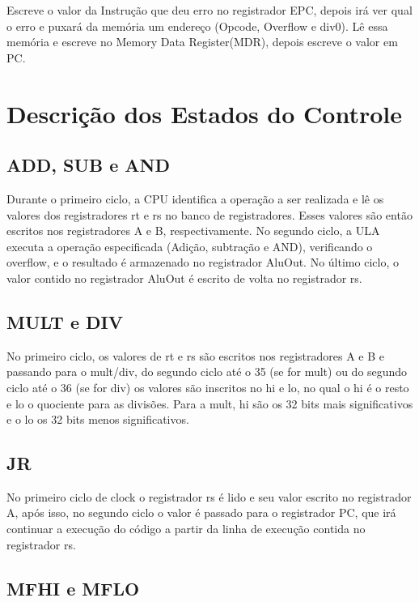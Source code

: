 Escreve o valor da Instrução que deu erro no registrador EPC, depois irá ver qual o erro e puxará da memória um endereço (Opcode, Overflow e div0). Lê essa memória e escreve no Memory Data Register(MDR), depois escreve o valor em PC.
 
\newpage

\section{Descrição dos Estados do Controle}

\subsection{ADD, SUB e AND}
Durante o primeiro ciclo, a CPU identifica a operação a ser realizada e lê os valores dos registradores rt e rs no banco de registradores. Esses valores são então escritos nos registradores A e B, respectivamente. No segundo ciclo, a ULA executa a operação especificada (Adição, subtração e AND), verificando o overflow, e o resultado é armazenado no registrador AluOut. No último ciclo, o valor contido no registrador AluOut é escrito de volta no registrador rs.

\subsection{MULT e DIV}

No primeiro ciclo, os valores de rt e rs são escritos nos registradores A e B e passando para o mult/div, do segundo ciclo até o 35 (se for mult) ou do segundo ciclo até o 36 (se for div) os valores são inscritos no hi e lo, no qual o hi é o resto e lo o quociente para as divisões. Para a mult, hi são os 32 bits mais significativos e o lo os 32 bits menos significativos.

\subsection{JR}

No primeiro ciclo de clock o registrador rs é lido e seu valor escrito no registrador A, após isso, no segundo ciclo o valor é passado para o registrador PC, que irá continuar a execução do código a partir da linha de execução contida no registrador rs.


\subsection{MFHI e MFLO}

